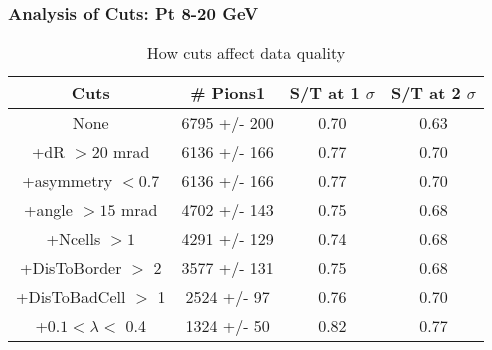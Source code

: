 \frame
{
\frametitle{Analysis of Cuts: Pt 8-20 GeV}
\begin{table}
\caption{How cuts affect data quality}
\centering
\begin{tabular}{c c c c}
\hline\hline
Cuts & \# Pions1 & S/T at 1 $\sigma$ & S/T at 2 $\sigma$ \\ [0.5ex]
\hline
None & 6795 +/-  200 & 0.70 & 0.63 \\ %
+dR $> 20$ mrad & 6136 +/-  166 & 0.77 & 0.70 \\ %
+asymmetry $< 0.7$ & 6136 +/-  166 & 0.77 & 0.70 \\ %
+angle $> 15$ mrad & 4702 +/-  143 & 0.75 & 0.68 \\ %
+Ncells $> 1$& 4291 +/-  129 & 0.74 & 0.68 \\ %
+DisToBorder $>$ 2 & 3577 +/-  131 & 0.75 & 0.68 \\ %
+DisToBadCell $>$ 1& 2524 +/-   97 & 0.76 & 0.70 \\ %
+$0.1 < \lambda <$ 0.4 & 1324 +/-   50 & 0.82 & 0.77 \\ %
[1ex]
\hline
\end{tabular}
\label{table:nonlin}
\end{table}
}
